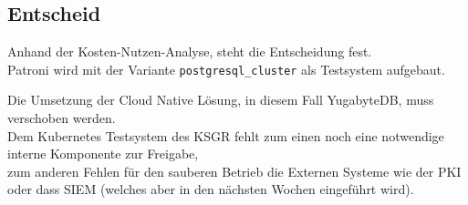 
\begin{flushleft}
    \subsection{Entscheid}
    Anhand der Kosten-Nutzen-Analyse, steht die Entscheidung fest.\\
    Patroni wird mit der Variante \texttt{postgresql\_cluster} als Testsystem aufgebaut.
\end{flushleft}
\begin{flushleft}
    Die Umsetzung der Cloud Native Lösung, in diesem Fall YugabyteDB, muss verschoben werden.\\
    Dem \Gls{Kubernetes} Testsystem des KSGR fehlt zum einen noch eine notwendige interne Komponente zur Freigabe,\\
    zum anderen Fehlen für den sauberen Betrieb die Externen Systeme wie der \Gls{PKI} oder dass \Gls{SIEM} (welches aber in den nächsten Wochen eingeführt wird).
\end{flushleft}